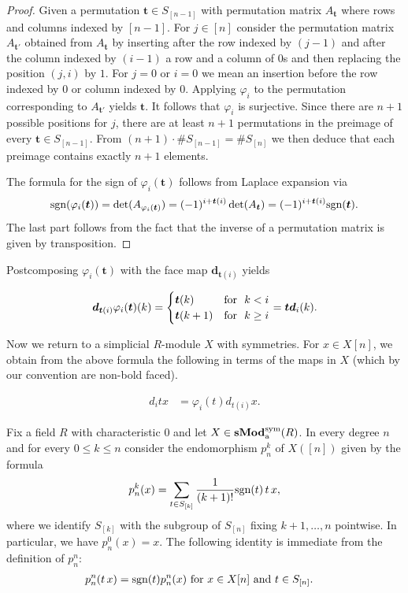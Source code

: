 \documentclass[12pt]{amsart}
\theoremstyle{plain}
\numberwithin{lemma}{\DefaultNumberTheoremWithin}
\numberwithin{claim}{\DefaultNumberTheoremWithin}
\numberwithin{theorem}{\DefaultNumberTheoremWithin}
\numberwithin{corollary}{\DefaultNumberTheoremWithin}
\numberwithin{proposition}{\DefaultNumberTheoremWithin}
\numberwithin{conjecture}{\DefaultNumberTheoremWithin}
\theoremstyle{definition}
\theoremstyle{definition}
\numberwithin{question}{\DefaultNumberTheoremWithin}
\theoremstyle{definition}
\numberwithin{problem}{\DefaultNumberTheoremWithin}
\theoremstyle{remark}
\numberwithin{remark}{\DefaultNumberTheoremWithin}
\theoremstyle{remark}
\numberwithin{example}{\DefaultNumberTheoremWithin}
\def\for{\textnormal{for }}
\def\sgn{\textnormal{sgn}}
\def\symtowermap{\varphi}
\def\bd{\boldsymbol d}
\def\bt{\boldsymbol t}
\newcommand{\sMod}[2]{\mathbf{sMod}_\textnormal{a}^{\textnormal{#1}}(#2)}  %
\newcommand{\Sym}[1]{S_{[#1]}}
\newcommand{\pmap}[2]{p_{#2}^{#1}}
\begin{document}
\begin{proof}
Given a permutation $\bt\in \Sym{n-1}$ with permutation matrix $A_{\bt}$ where rows and columns indexed by $[n-1]$. For $j \in [n]$ consider the permutation matrix $A_{\bt'}$ obtained from $A_{\bt}$ by inserting after the row indexed by $(j-1)$
and after the column indexed by $(i-1)$ a row and a column of $0$s and then replacing the position $(j,i)$ by $1$. For $j=0$ or $i=0$ we mean an
insertion before the row indexed by $0$ or column indexed by $0$.
Applying $\symtowermap_i$ to the permutation corresponding to $A_{\bt'}$ yields $\bt$. It follows that
$\symtowermap_i$ is surjective.  Since there are $n+1$ possible positions for $j$, there are at least $n+1$ permutations in the preimage of every 
$\bt \in \Sym{n-1}$. From
$(n+1) \cdot \# \Sym{n-1} = \#
S_{[n]}$ we then deduce that 
each preimage contains exactly $n+1$ elements.



The formula for the sign of $\symtowermap_i(\bt)$ follows from Laplace expansion via
\[
\sgn(\symtowermap_i(\bt))=\mathrm{det}(A_{\symtowermap_i(\bt)})=(-1)^{i+\bt(i)}\det(A_{\bt})=(-1)^{i+\bt(i)}\sgn(\bt).
\]
The last part follows from the fact that the inverse of a permutation matrix is given by transposition.
\end{proof}

Postcomposing $\symtowermap_i(\bt)$ with the face map $\bd_{\bt(i)}$ yields

\[
\bd_{\bt(i)} \symtowermap_i(\bt)(k)=\begin{cases}
\bt(k) & \for~ k<i\\
\bt(k+1) & \for~ k\geq i
\end{cases}=\bt\bd_i(k).
\]

Now we return to a simplicial $R$-module $X$ with symmetries. For $x\in X[n]$, we obtain from 
the above formula the following in terms of the maps in $X$ (which by our convention are non-bold faced).

\begin{align} \label{eq:phi}
    d_i t x & =\symtowermap_i(t)d_{t(i)} x.
\end{align}


Fix a field $R$ with characteristic $0$ and let $X\in \sMod{sym}{R}$. In every degree $n$ and for every $0\leq k\leq n$ consider the endomorphism $\pmap{k}{n}$ of $X([n])$ given by the formula
\[
\pmap{k}{n}(x)=\sum_{t\in \Sym{k}}\frac{1}{(k+1)!}\sgn(t)\,t\,x,
\]
where we identify $\Sym{k}$ with the subgroup of $\Sym{n}$ fixing $k+1,\ldots, n$ pointwise. In particular, we have $\pmap{0}{n}(x)=x$. The following identity is
immediate from the definition of $\pmap{n}{n}$:
\begin{align} \label{eq:equiv}  
  \pmap{n}{n}(t\,x) & = \sgn(t) \pmap{n}{n}(x) \text{ for } x \in X[n] \text{ and } t \in \Sym{n}. 
\end{align}
\end{document}
